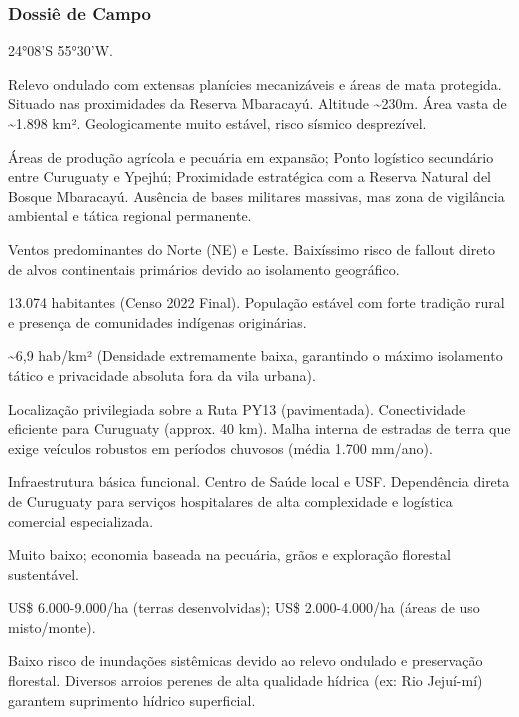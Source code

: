 \subsubsection{Dossiê de Campo}
\begin{description}[style=nextline,leftmargin=0.5cm,font=\bfseries]
\item[Coordenadas]  24°08'S 55°30'W.
\item[Topografia]  Relevo ondulado com extensas planícies mecanizáveis e áreas de mata protegida. Situado nas proximidades da Reserva Mbaracayú. Altitude \textasciitilde 230m. Área vasta de \textasciitilde 1.898 km². Geologicamente muito estável, risco sísmico desprezível.
\item[Alvos Estratégicos]  Áreas de produção agrícola e pecuária em expansão; Ponto logístico secundário entre Curuguaty e Ypejhú; Proximidade estratégica com a Reserva Natural del Bosque Mbaracayú. Ausência de bases militares massivas, mas zona de vigilância ambiental e tática regional permanente.
\item[Fallout]  Ventos predominantes do Norte (NE) e Leste. Baixíssimo risco de fallout direto de alvos continentais primários devido ao isolamento geográfico.
\item[População]  13.074 habitantes (Censo 2022 Final). População estável com forte tradição rural e presença de comunidades indígenas originárias.
\item[Densidade]  \textasciitilde 6,9 hab/\allowbreak km² (Densidade extremamente baixa, garantindo o máximo isolamento tático e privacidade absoluta fora da vila urbana).
\item[Vias de Acesso]  Localização privilegiada sobre a Ruta PY13 (pavimentada). Conectividade eficiente para Curuguaty (approx. 40 km). Malha interna de estradas de terra que exige veículos robustos em períodos chuvosos (média 1.700 mm/\allowbreak ano).
\item[Serviços]  Infraestrutura básica funcional. Centro de Saúde local e USF. Dependência direta de Curuguaty para serviços hospitalares de alta complexidade e logística comercial especializada.
\item[Custo de Vida]  Muito baixo; economia baseada na pecuária, grãos e exploração florestal sustentável.
\item[Preço da Terra]  US\$ 6.000-9.000/\allowbreak ha (terras desenvolvidas); US\$ 2.000-4.000/\allowbreak ha (áreas de uso misto/\allowbreak monte).
\item[Hidrologia]  Baixo risco de inundações sistêmicas devido ao relevo ondulado e preservação florestal. Diversos arroios perenes de alta qualidade hídrica (ex: Rio Jejuí-mí) garantem suprimento hídrico superficial.

\end{description}
